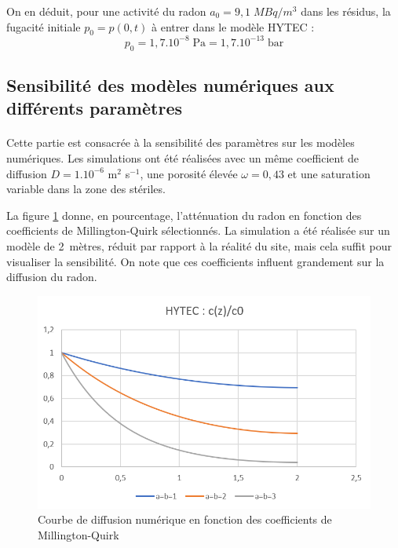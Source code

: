 \documentclass{article}
\begin{document}
On en déduit, pour une activité du radon $a_0=9,1 \; MBq/m^3$ dans les résidus, la fugacité initiale $p_0=p(0,t)$ à entrer dans le modèle HYTEC :
$$
p_0=1,7 .10^{-8} \; \text{Pa}=1,7 .10^{-13} \; \text{bar}
$$

\subsection{Sensibilité des modèles numériques aux différents paramètres}
\label{annexe:sens_numerique}

\paragraph{} Cette partie est consacrée à la sensibilité des paramètres sur les modèles numériques. Les simulations ont été réalisées avec un même coefficient de diffusion $D = 1.10^{-6}$ m$^2 \!$ s$^{-1}$, une porosité élevée $\omega = 0,43$ et une saturation variable dans la zone des stériles.

La figure \ref{fig:sens_hytec_mq} donne, en pourcentage, l'atténuation du radon en fonction des coefficients de Millington-Quirk sélectionnés. La simulation a été réalisée sur un modèle de 2~mètres, réduit par rapport à la réalité du site, mais cela suffit pour visualiser la sensibilité. On note que ces coefficients influent grandement sur la diffusion du radon.

\begin{figure}[H]
    \centering
    \includegraphics[height = 0.4 \textheight]{III_C_10.png}
    \caption{Courbe de diffusion numérique en fonction des coefficients de Millington-Quirk}
    \label{fig:sens_hytec_mq}
\end{figure}
\end{document}
